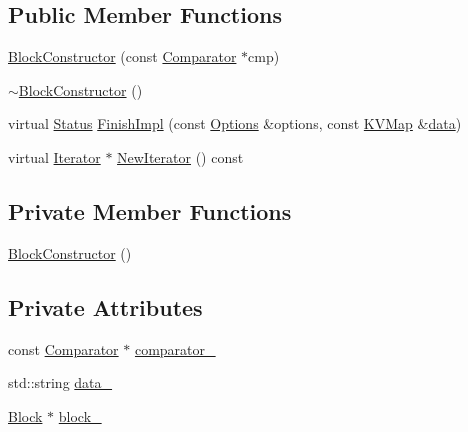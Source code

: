 \subsection*{Public Member Functions}
\begin{DoxyCompactItemize}
\item 
\hyperlink{classleveldb_1_1_block_constructor_a1f89523b9e688d6525da80d5595bee4c}{Block\+Constructor} (const \hyperlink{structleveldb_1_1_comparator}{Comparator} $\ast$cmp)
\item 
\hyperlink{classleveldb_1_1_block_constructor_a3eb2422f0a8eebe30c95c9e1f8b04ac9}{$\sim$\+Block\+Constructor} ()
\item 
virtual \hyperlink{classleveldb_1_1_status}{Status} \hyperlink{classleveldb_1_1_block_constructor_ae3f38f0769d34cb7d80776b8249f48ae}{Finish\+Impl} (const \hyperlink{structleveldb_1_1_options}{Options} \&options, const \hyperlink{namespaceleveldb_aac1e50450147be263e08252c6700f7a7}{K\+V\+Map} \&\hyperlink{classleveldb_1_1_constructor_a55a0363200d6e86d8beb3b15b75e3824}{data})
\item 
virtual \hyperlink{classleveldb_1_1_iterator}{Iterator} $\ast$ \hyperlink{classleveldb_1_1_block_constructor_a94b568e7f3aa7ad26eda141c3b4297ca}{New\+Iterator} () const 
\end{DoxyCompactItemize}
\subsection*{Private Member Functions}
\begin{DoxyCompactItemize}
\item 
\hyperlink{classleveldb_1_1_block_constructor_a4bc6a92e47ee2ec35ab4147940eb1564}{Block\+Constructor} ()
\end{DoxyCompactItemize}
\subsection*{Private Attributes}
\begin{DoxyCompactItemize}
\item 
const \hyperlink{structleveldb_1_1_comparator}{Comparator} $\ast$ \hyperlink{classleveldb_1_1_block_constructor_a8032f2282569a0e187c2b05e4020c348}{comparator\+\_\+}
\item 
std\+::string \hyperlink{classleveldb_1_1_block_constructor_a16288721d4801a1211ae00295866a142}{data\+\_\+}
\item 
\hyperlink{classleveldb_1_1_block}{Block} $\ast$ \hyperlink{classleveldb_1_1_block_constructor_a1ad4f51fb9369b137462a6693b6a69ae}{block\+\_\+}
\end{DoxyCompactItemize}


